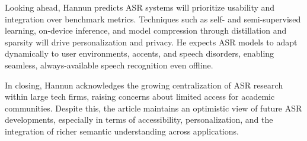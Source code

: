 \documentclass[12pt]{article}
\begin{document}
Looking ahead, Hannun predicts ASR systems will prioritize usability and integration over benchmark metrics. Techniques such as self- and semi-supervised learning, on-device inference, and model compression through distillation and sparsity will drive personalization and privacy. He expects ASR models to adapt dynamically to user environments, accents, and speech disorders, enabling seamless, always-available speech recognition even offline.

In closing, Hannun acknowledges the growing centralization of ASR research within large tech firms, raising concerns about limited access for academic communities. Despite this, the article maintains an optimistic view of future ASR developments, especially in terms of accessibility, personalization, and the integration of richer semantic understanding across applications.
\end{document}
